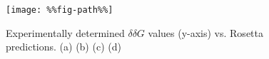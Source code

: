 \begin{figure}
  \centering
  \texttt{[image: \%\%fig-path\%\%]}
  \caption{
    Experimentally determined $\delta\delta G$ values (y-axis) vs. Rosetta predictions.
    (a) %
    (b) %
    (c) %
    (d) %
  } \label{fig:figure-2}
\end{figure}
